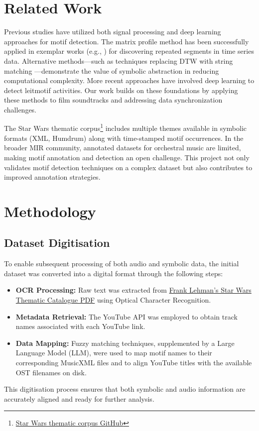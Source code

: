 \documentclass[conference]{IEEEtran}
\begin{document}
\section{Related Work}

Previous studies have utilized both signal processing and deep learning approaches for motif detection. The matrix profile method has been successfully applied in exemplar works (e.g., \cite{Nuttall2023}) for discovering repeated segments in time series data. Alternative methods—such as techniques replacing DTW with string matching \cite{Ganguli2017}—demonstrate the value of symbolic abstraction in reducing computational complexity. More recent approaches have involved deep learning \cite{Krause2021} to detect leitmotif activities. Our work builds on these foundations by applying these methods to film soundtracks and addressing data synchronization challenges.

The Star Wars thematic corpus\footnote{\href{https://github.com/Computational-Cognitive-Musicology-Lab/Star-Wars-Thematic-Corpus/}{Star Wars thematic corpus GitHub}} includes multiple themes available in symbolic formats (XML, Humdrum) along with time-stamped motif occurrences. In the broader MIR community, annotated datasets for orchestral music are limited, making motif annotation and detection an open challenge. This project not only validates motif detection techniques on a complex dataset but also contributes to improved annotation strategies.

\section{Methodology}

\subsection{Dataset Digitisation}
To enable subsequent processing of both audio and symbolic data, the initial dataset was converted into a digital format through the following steps:
\begin{itemize}
    \item \textbf{OCR Processing:} Raw text was extracted from \href{https://franklehman.com/starwars/}{Frank Lehman's Star Wars Thematic Catalogue PDF} using Optical Character Recognition.
    \item \textbf{Metadata Retrieval:} The YouTube API was employed to obtain track names associated with each YouTube link.
    \item \textbf{Data Mapping:} Fuzzy matching techniques, supplemented by a Large Language Model (LLM), were used to map motif names to their corresponding MusicXML files and to align YouTube titles with the available OST filenames on disk.
\end{itemize}
This digitisation process ensures that both symbolic and audio information are accurately aligned and ready for further analysis.
\end{document}
